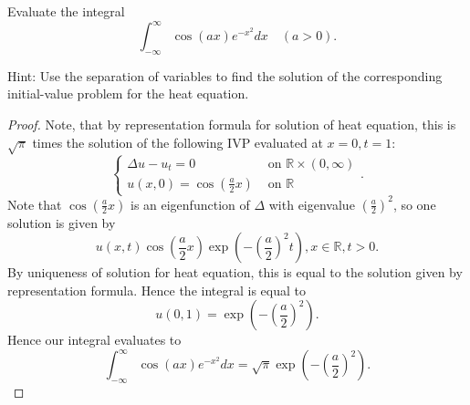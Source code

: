 \begin{problem}
	Evaluate the integral
\[
\int_{-\infty}^{\infty} \cos (a x) e^{-x^2} d x \quad(a>0) .
\]

Hint: Use the separation of variables to find the solution of the corresponding initial-value problem for the heat equation.
\end{problem}
\begin{proof}
	Note, that by representation formula for solution of heat equation, this is $\sqrt{\pi} $ times the solution of the following IVP evaluated at $x = 0, t = 1$:
	\[
		\begin{cases}
			\Delta u - u_t = 0 & \text{ on } \mathbb{R} \times (0,\infty )\\
			u(x,0) = \cos\left(\frac{a}{2} x\right) & \text{ on } \mathbb{R}
		\end{cases}
	.\] 
	Note that $\cos\left( \frac{a}{2} x \right) $ is an eigenfunction of $\Delta$ with eigenvalue $\left( \frac{a}{2} \right) ^2$, so one solution is given by
	\[
		u(x, t) \cos\left( \frac{a}{2} x \right) \exp\left( - \left( \frac{a}{2} \right) ^2 t \right) , x \in \mathbb{R}, t > 0
	.\] 
	By uniqueness of solution for heat equation, this is equal to the solution given by representation formula. Hence the integral is equal to
	\[
		u(0,1) = \exp\left( - \left( \frac{a}{2} \right) ^2 \right) 
	.\] 
	Hence our integral evaluates to 
	\[
		\int_{-\infty}^{\infty} \cos (a x) e^{-x^2} d x = \sqrt{\pi} 
		\exp\left( - \left( \frac{a}{2} \right) ^2 \right) 
	.\] 
\end{proof}

